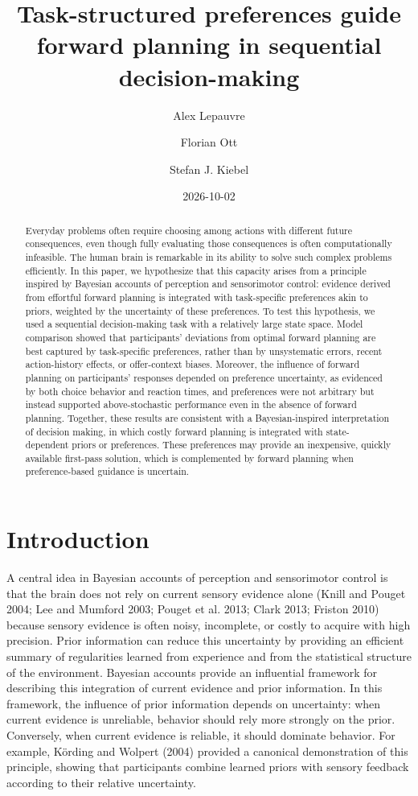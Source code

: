 \documentclass[
  letterpaper,
  DIV=11,
  numbers=noendperiod]{scrartcl}
\title{Task-structured preferences guide forward planning in sequential
decision-making}
\author{Alex Lepauvre \and Florian Ott \and Stefan J. Kiebel}
\date{2026-10-02}
\begin{document}
\maketitle
\begin{abstract}
Everyday problems often require choosing among actions with different
future consequences, even though fully evaluating those consequences is
often computationally infeasible. The human brain is remarkable in its
ability to solve such complex problems efficiently. In this paper, we
hypothesize that this capacity arises from a principle inspired by
Bayesian accounts of perception and sensorimotor control: evidence
derived from effortful forward planning is integrated with task-specific
preferences akin to priors, weighted by the uncertainty of these
preferences. To test this hypothesis, we used a sequential
decision-making task with a relatively large state space. Model
comparison showed that participants' deviations from optimal forward
planning are best captured by task-specific preferences, rather than by
unsystematic errors, recent action-history effects, or offer-context
biases. Moreover, the influence of forward planning on participants'
responses depended on preference uncertainty, as evidenced by both
choice behavior and reaction times, and preferences were not arbitrary
but instead supported above-stochastic performance even in the absence
of forward planning. Together, these results are consistent with a
Bayesian-inspired interpretation of decision making, in which costly
forward planning is integrated with state-dependent priors or
preferences. These preferences may provide an inexpensive, quickly
available first-pass solution, which is complemented by forward planning
when preference-based guidance is uncertain.
\end{abstract}


\section{Introduction}\label{introduction}

A central idea in Bayesian accounts of perception and sensorimotor
control is that the brain does not rely on current sensory evidence
alone (Knill and Pouget 2004; Lee and Mumford 2003; Pouget et al. 2013;
Clark 2013; Friston 2010) because sensory evidence is often noisy,
incomplete, or costly to acquire with high precision. Prior information
can reduce this uncertainty by providing an efficient summary of
regularities learned from experience and from the statistical structure
of the environment. Bayesian accounts provide an influential framework
for describing this integration of current evidence and prior
information. In this framework, the influence of prior information
depends on uncertainty: when current evidence is unreliable, behavior
should rely more strongly on the prior. Conversely, when current
evidence is reliable, it should dominate behavior. For example, Körding
and Wolpert (2004) provided a canonical demonstration of this principle,
showing that participants combine learned priors with sensory feedback
according to their relative uncertainty.
\end{document}
